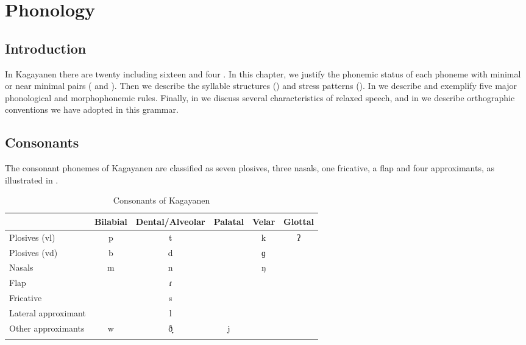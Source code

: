 \chapter{Phonology}\label{chap:phonology}
\section{Introduction}\label{introduction-2}
In Kagayanen there are twenty  including sixteen  and four . In this chapter, we justify the phonemic status of each phoneme with minimal or near minimal pairs ( and ). Then we describe the syllable structures () and stress patterns (). In  we describe and exemplify five major phonological and morphophonemic rules. Finally, in  we discuss several characteristics of relaxed speech, and in  we describe orthographic conventions we have adopted in this grammar.
\section{Consonants}
\label{bkm:Ref360478146}\label{sec:consonants}

The consonant phonemes of Kagayanen are classified as seven plosives, three nasals, one fricative, a flap and four approximants, as illustrated in .

\begin{table}
\caption{Consonants of Kagayanen}
\label{tab2.1}
\begin{tabularx}{\textwidth}{Qccccc}
\lsptoprule 
& \textbf{Bilabial} & \textbf{Dental/Alveolar}& \textbf{Palatal} & \textbf{Velar} & \textbf{Glottal} \\
\midrule
Plosives (vl) & p & t &  & k & ʔ \\
Plosives (vd) & b & d &  & ɡ & \\
Nasals & m & n &  & ŋ & \\
Flap &  & ɾ &  &  & \\
Fricative &  & s &  & & \\
Lateral approximant &  & l &  & & \\
Other approximants & w & ð̞ & j &  & \\
\lspbottomrule
\end{tabularx}
\end{table}


